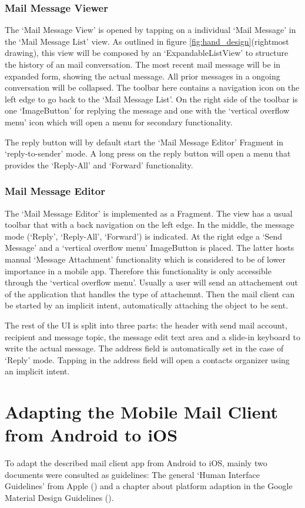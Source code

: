 \documentclass[a4paper,11pt,twoside]{article}
\begin{document}
\subsubsection{Mail Message Viewer}
The `Mail Message View' is opened by tapping on a individual `Mail Message' in
the `Mail Message List' view. As outlined in figure
\ref{fig:hand_design}(rightmost drawing), this view will be composed by an
`ExpandableListView' to structure the history of an mail conversation. The most
recent mail message will be in expanded form, showing the actual message. All
prior messages in a ongoing conversation will be collapsed. The toolbar here
contains a navigation icon on the left edge to go back to the `Mail Message
List'. On the right side of the toolbar is one `ImageButton' for replying the
message and one with the `vertical overflow menu' icon which will open a menu
for secondary functionality.

The reply button will by default start the `Mail Message Editor' Fragment in
`reply-to-sender' mode. A long press on the reply button will open a menu that
provides the `Reply-All' and `Forward' functionality.


\subsubsection{Mail Message Editor}
The `Mail Message Editor' is implemented as a Fragment. The view has a usual
toolbar that with a back navigation on the left edge. In the middle, the message
mode (`Reply', `Reply-All', `Forward') is indicated. At the right edge a `Send
Message' and a `vertical overflow menu' ImageButton is placed. The latter hosts
manual `Message Attachment' functionality which is considered to be of lower importance
in a mobile app. Therefore this functionality is only accessible through the
`vertical overflow menu'. Usually a user will send an attachement out of the
application that handles the type of attachemnt. Then the mail client can be
started by an implicit intent, automatically attaching the object to be sent.

The rest of the UI is split  into three parts: the  header with send mail
account, recipient and message topic, the message edit text area and a slide-in
keyboard to write the actual message. The address field is automatically set
in the case of `Reply' mode. Tapping in the address field will open a contacts
organizer using an implicit intent.

\section{Adapting the Mobile Mail Client from Android to iOS}
To adapt the described mail client app from Android to iOS, mainly two documents
were consulted as guidelines: The general `Human Interface Guidelines' from
Apple (\cite{apple_ios_design}) and a chapter about platform adaption in the
Google Material Design Guidelines (\cite{adapt_ios}).
\end{document}
